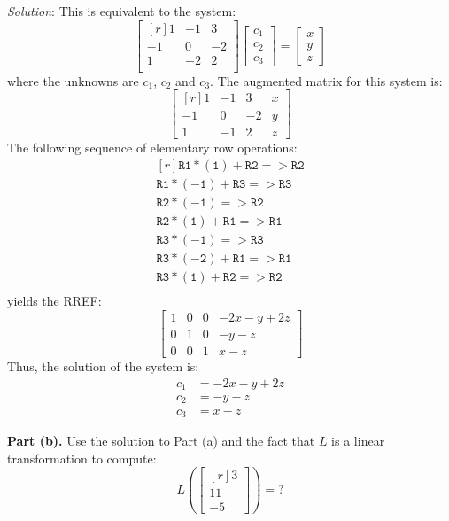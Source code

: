 \documentclass[12pt]{article}
\begin{document}
\emph{Solution}:
This is equivalent to the system:
\[
\begin{bmatrix*}[r]
1&-1&3\\
-1&0&-2\\
1&-2&2\\ 
\end{bmatrix*}
\begin{bmatrix}c_1\\c_2\\c_3\end{bmatrix}=
\begin{bmatrix}x\\y\\z\end{bmatrix}
\]
where the unknowns are $c_1$, $c_2$ and $c_3$. The augmented matrix for this system is:
\[
\left[\begin{matrix*}[r]1 & -1 & 3 & x\\-1 & 0 & -2 & y\\1 & -1 & 2 & z\end{matrix*}\right]
\]
The following sequence of elementary row operations:
\[
\begin{matrix*}[r]
\mathtt{R1*(1)+R2=>R2}\\
\mathtt{R1*(-1)+R3=>R3}\\
\mathtt{R2*(-1)=>R2}\\
\mathtt{R2*(1)+R1=>R1}\\
\mathtt{R3*(-1)=>R3}\\
\mathtt{R3*(-2)+R1=>R1}\\
\mathtt{R3*(1)+R2=>R2}\\
\end{matrix*}
\]
yields the RREF:
\[
\left[\begin{matrix}1 & 0 & 0 & - 2 x - y + 2 z\\0 & 1 & 0 & - y - z\\0 & 0 & 1 & x - z\end{matrix}\right]
\]
Thus, the solution of the system is:
\begin{align*}
c_1&=- 2 x - y + 2 z\\
c_2&=- y - z\\
c_3&= x - z
\end{align*}
\proofend

\textbf{Part (b).} Use the solution to Part (a) and the fact that $L$ is a linear transformation to compute:
\[
L\left(\begin{bmatrix*}[r] 3 \\ 11 \\ -5\end{bmatrix*}\right)=? 
\]
\end{document}
